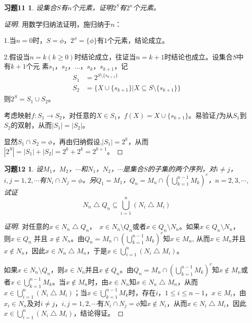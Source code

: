 \documentclass{book}[oneside]
\begin{document}
\begin{CJK*}{UTF8}{gbsn}
 

  \clearpage

\newtheorem*{Exercise11}{习题11}
  \begin{Exercise11}
    设集合$S$有$n$个元素，证明$2^S$有$2^n$个元素。
  \end{Exercise11}

  \begin{proof}[证明]
    用数学归纳法证明，施归纳于$n$：

    1.当$n=0$时，$S=\phi$，$2^{\phi} = \{\phi\}$有$1$个元素，结论成立。

    2.假设当$n=k(k\geq
    0)$时结论成立，往证当$n=k+1$时结论也成立。设集合$S$中有$k+1$个元
    素$s_1$，$s_2$，$\ldots$，$s_k$，$s_{k+1}$，记
    \begin{align*}
      S_1&=2^{S\setminus \{s_{k+1}\}}\\
      S_2&=\{X\cup \{s_{k+1}\}|X\subseteq S\setminus \{s_{k+1}\}\}
    \end{align*}
    则$2^S = S_1\cup S_2$。

    考虑映射$f:S_1\to S_2$，对任意的$X\in S_1$，$f(X)=X\cup \{s_{k+1}\}$。易验证$f$为从$S_1$到$S_2$的双射，从而$|S_1|=|S_2|$。

    显然$S_1\cap S_2=\phi$，再由归纳假设,$|S_1|=2^k$，从而$|2^S|=|S_1|+|S_2|=2^k+2^k=2^{k+1}$。
    
  \end{proof}
\newtheorem*{Exercise12}{习题12}
  
      \begin{Exercise12}
    设$M_1$，$M_2$，$\cdots$和$N_1$，$N_2$，$\cdots$是集合$S$的子集的两个序列，对$i \neq j$，$i, j = 1, 2, \cdots$有$N_i\cap N_j=\phi$。另$Q_1 = M_1$，$Q_n = M_n \cap (\bigcup_{k=1}^{n-1}M_k)^c$，$n=2,3,\cdots$, 试证
    \[N_n \bigtriangleup Q_n \subseteq \bigcup_{i=1}^n(N_i\bigtriangleup M_i)\]
  \end{Exercise12}
  \begin{proof}[证明]
    对任意的$x \in N_n \bigtriangleup Q_n$，　$x\in N_n \setminus Q_n$或者$x\in Q_n \setminus N_n$。如果$x\in Q_n \setminus N_n$，　则$x \in Q_n$ 并且 $x \notin N_n$。由$Q_n = M_n \cap (\bigcup_{k=1}^{n-1}M_k)^c$知$x \in M_n$, 从而$x\in M_n$并且$x\notin N_n$，因此$x \in N_n\bigtriangleup M_n$，于是$x \in \bigcup_{i=1}^n(N_i\bigtriangleup M_i)$。

    如果$x\in N_n \setminus Q_n$，则$x\in N_n$并且$x\notin Q_n$。由$Q_n = M_n \cap (\bigcup_{k=1}^{n-1}M_k)^c$知$x\notin M_n$或者$x\in \bigcup_{k=1}^{n-1}M_k$。当$x \notin M_n$时，由$x\in N_n$知$x \in N_n\bigtriangleup M_n$，从而$x\in \bigcup_{i=1}^n(N_i\bigtriangleup M_i)$；当$x\in \bigcup_{k=1}^{n-1}M_k$时，存在$i$，$1\leq i \leq n-1$，$x\in M_i$，由$x_i\in N_n$及对$i \neq j$，$i, j = 1, 2, \cdots$有$N_i\cap N_j=\phi$知$x\notin N_i$，从而$x\in N_i\bigtriangleup M_i$，因此$x\in \bigcup_{i=1}^n(N_i\bigtriangleup M_i)$，结论得证。
  \end{proof}



\end{CJK*}
\end{document}
